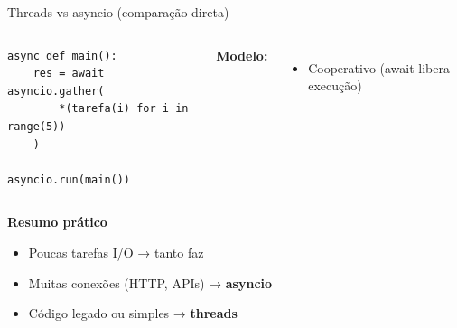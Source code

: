 \documentclass{beamer}
\begin{document}
\begin{frame}[fragile]{Threads vs asyncio (comparação direta)}
\begin{columns}[t]
\begin{verbatim}
async def main():
    res = await asyncio.gather(
        *(tarefa(i) for i in range(5))
    )

asyncio.run(main())
        \end{verbatim}
        
        \textbf{Modelo:}
        \begin{itemize}
            \item Cooperativo (await libera execução)
        \end{itemize}
        
    \end{columns}
    
    \vspace{0.3cm}
    
    \textbf{Resumo prático}
    
    \begin{itemize}
        \item Poucas tarefas I/O → tanto faz
        \item Muitas conexões (HTTP, APIs) → \textbf{asyncio}
        \item Código legado ou simples → \textbf{threads}
    \end{itemize}
    
\end{frame}
\end{document}
